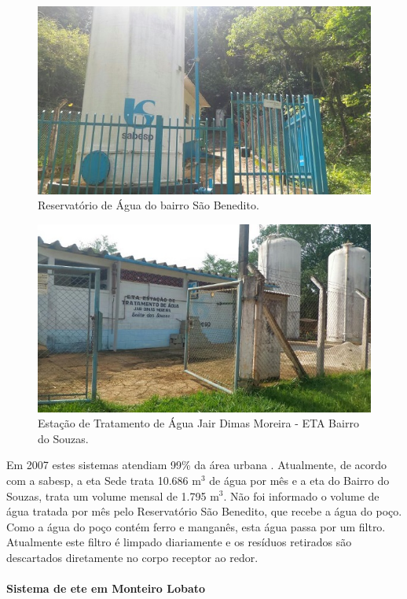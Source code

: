 	
	\begin{figure}
		\centering
		\includegraphics[width=0.75\linewidth]{produtos/prodtres/image056}
		\caption{Reservatório de Água do bairro São Benedito.}
		\label{fig:image056}
	\end{figure}
	
	
	\begin{figure}
		\centering
		\includegraphics[width=0.75\linewidth]{produtos/prodtres/image057}
		\caption{Estação de Tratamento de Água Jair Dimas Moreira - ETA Bairro do Souzas.}
		\label{fig:image057}
	\end{figure}
	
	
	Em 2007 estes sistemas atendiam 99\% da área urbana \cite{MonteiroLobato}. Atualmente, de acordo com a \gls{sabesp}, a \gls{eta} Sede trata 10.686 m$^{3}$ de água por mês e a \gls{eta} do Bairro do Souzas, trata um volume mensal de 1.795 m$^{3}$. Não foi informado o volume de água tratada por mês pelo Reservatório São Benedito, que recebe a água do poço. Como a água do poço contém ferro e manganês, esta água passa por um filtro. Atualmente este filtro é limpado diariamente e os resíduos retirados são descartados diretamente no corpo receptor ao redor.
	
	\paragraph{\textbf{Sistema de \gls{ete} em Monteiro Lobato}}
	
